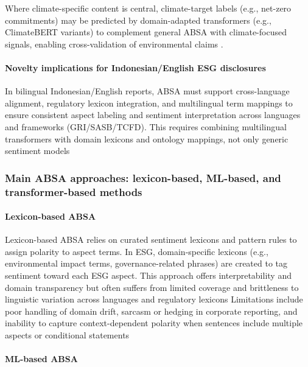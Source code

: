 Where climate-specific content is central, climate-target labels (e.g., net-zero commitments) may be predicted by domain-adapted transformers (e.g., ClimateBERT variants) to complement general ABSA with climate-focused signals, enabling cross-validation of environmental claims \cite{10.21203/rs.3.rs-3600821/v1,10.48550/arxiv.2510.01222,10.18653/v1/2023.emnlp-main.975,10.1108/dta-01-2024-0065} .

\paragraph{Novelty implications for Indonesian/English ESG disclosures}
In bilingual Indonesian/English reports, ABSA must support cross-language alignment, regulatory lexicon integration, and multilingual term mappings to ensure consistent aspect labeling and sentiment interpretation across languages and frameworks (GRI/SASB/TCFD). This requires combining multilingual transformers with domain lexicons and ontology mappings, not only generic sentiment models \cite{10.1016/j.inffus.2025.103073,10.1111/eufm.12509,10.48550/arxiv.2511.00024,10.3390/math12193119}

\subsubsection{Main ABSA approaches: lexicon-based, ML-based, and transformer-based methods}

\paragraph{Lexicon-based ABSA}


Lexicon-based ABSA relies on curated sentiment lexicons and pattern rules to assign polarity to aspect terms. In ESG, domain-specific lexicons (e.g., environmental impact terms, governance-related phrases) are created to tag sentiment toward each ESG aspect. This approach offers interpretability and domain transparency but often suffers from limited coverage and brittleness to linguistic variation across languages and regulatory lexicons \cite{10.21203/rs.3.rs-1120307/v1,10.1111/fmii.12181,10.1111/obes.12597}
Limitations include poor handling of domain drift, sarcasm or hedging in corporate reporting, and inability to capture context-dependent polarity when sentences include multiple aspects or conditional statements \cite{10.1111/fmii.12181,10.1111/obes.12597,10.1002/csr.3242}

\paragraph{ML-based ABSA}

